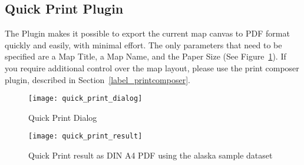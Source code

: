 
\subsection{Quick Print Plugin}


The  Plugin makes it possible to export the current 
map canvas to PDF format quickly and easily, with minimal effort. The only parameters that 
need to be specified are a Map Title, a Map Name, and the Paper Size (See Figure~\ref{fig:quickprint}). 
If you require additional control over the map layout, 
please use the print composer plugin, described in Section~\ref{label_printcomposer}.  

\begin{figure}[ht]
   \begin{center}
   \caption{Quick Print Dialog \nixcaption}\label{fig:quickprint}\smallskip
   \texttt{[image: quick\_print\_dialog]}
\end{center}
\end{figure}

\begin{figure}[ht]
   \begin{center}
   \caption{Quick Print result as DIN A4 PDF using the alaska sample dataset\nixcaption}\label{fig:quickprint_result}\smallskip
   \texttt{[image: quick\_print\_result]}
\end{center}
\end{figure}
